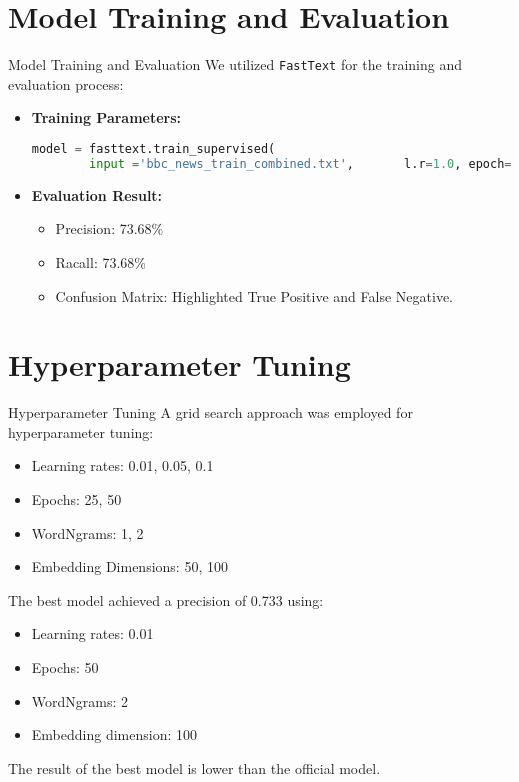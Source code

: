 \documentclass{beamer}
\begin{document}
\section{Model Training and Evaluation}
\begin{frame}[fragile]{Model Training and Evaluation}
We utilized \texttt{FastText} for the training and evaluation process:
\begin{itemize}
    \item\textbf{Training Parameters:}
\begin{lstlisting}[language=python]
model = fasttext.train_supervised(
        input ='bbc_news_train_combined.txt',       l.r=1.0, epoch=25,wordNgram=2,                  minCount=1, verbose=2)
\end{lstlisting}
\item \textbf{Evaluation Result:}
        \begin{itemize}
            \item Precision: 73.68\%
            \item Racall: 73.68\%
            \item Confusion Matrix: Highlighted True Positive and False Negative.
        \end{itemize}
\end{itemize}
\end{frame}

\section{Hyperparameter Tuning}
\begin{frame}{Hyperparameter Tuning}
A grid search approach was employed for hyperparameter tuning:
\begin{itemize}
    \item Learning rates: 0.01, 0.05, 0.1
    \item Epochs: 25, 50
    \item WordNgrams: 1, 2
    \item Embedding Dimensions: 50, 100
\end{itemize}
\vspace{0.5cm}
The best model achieved a precision of 0.733 using:
\begin{itemize}
    \item Learning rates: 0.01
    \item Epochs: 50
    \item WordNgrams: 2
    \item Embedding dimension: 100
\end{itemize}
The result of the best model is lower than the official model.
\end{frame}
\end{document}
